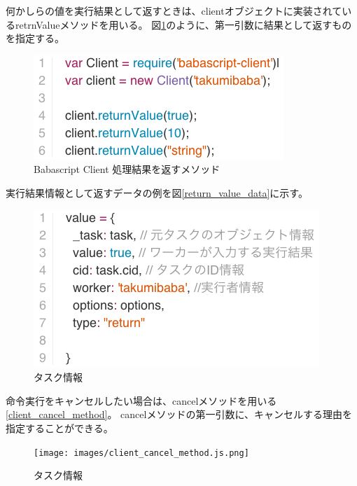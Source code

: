 何かしらの値を実行結果として返すときは、clientオブジェクトに実装されているretrnValueメソッドを用いる。
図\ref{fig:babascript_client_service_returnvalue}のように、第一引数に結果として返すものを指定する。

\begin{figure}[htbp]
  \begin{center}
  \includegraphics[width=.8\linewidth,bb=0 0 357 149]{images/babascript_client_service_returnvalue.js.png}
  \end{center}
  \caption{Babascript Client 処理結果を返すメソッド}
  \label{fig:babascript_client_service_returnvalue}
\end{figure}

実行結果情報として返すデータの例を図\ref{return_value_data}に示す。

\begin{figure}[htbp]
  \begin{center}
  \includegraphics[width=.6\linewidth,bb=0 0 408 225]{images/return_value_data.js.png}
  \end{center}
  \caption{タスク情報}
  \label{fig:return_value_data}
\end{figure}

命令実行をキャンセルしたい場合は、cancelメソッドを用いる\ref{client_cancel_method}。
cancelメソッドの第一引数に、キャンセルする理由を指定することができる。

\begin{figure}[htbp]
  \begin{center}
  \texttt{[image: images/client\_cancel\_method.js.png]}
  \end{center}
  \caption{タスク情報}
  \label{fig:client_cancel_method}
\end{figure}

